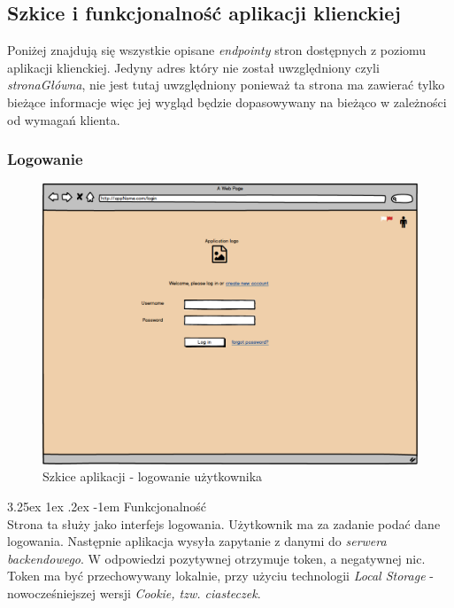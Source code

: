\documentclass[10pt,titlepage]{article} %
\makeatletter
\renewcommand{\normalsize}{\fontsize{8pt}{10pt}\selectfont} %
\renewcommand\paragraph{\@startsection{paragraph}{5}{\z@}%
  {3.25ex \@plus1ex \@minus.2ex}%
  {-1em}%
  {\normalfont\normalsize\bfseries}}
\makeatother
\begin{document}
\newpage
\subsection{Szkice i funkcjonalność aplikacji klienckiej}\label{Szkice i funkcjonalność aplikacji klienckiej}
Poniżej znajdują się wszystkie opisane \textit{endpointy} stron dostępnych z poziomu aplikacji klienckiej. Jedyny adres który nie został uwzględniony czyli \textit{stronaGłówna}, nie jest tutaj uwzględniony ponieważ ta strona ma zawierać tylko bieżące informacje więc jej wygląd będzie dopasowywany na bieżąco w zależności od wymagań klienta.

\subsubsection{Logowanie}
\begin{figure}[H]
\includegraphics[width=\textwidth]{img/sekcja2/loginScreenMock}
\caption[Szkice aplikacji - logowanie użytkownika]{Szkice aplikacji - logowanie użytkownika}
\end{figure}

\paragraph{Funkcjonalność}\mbox{}\\
Strona ta służy jako interfejs logowania. Użytkownik ma za zadanie podać dane logowania. Następnie aplikacja wysyła zapytanie z danymi do \textit{serwera backendowego}. W odpowiedzi pozytywnej otrzymuje token, a negatywnej nic. Token ma być przechowywany lokalnie, przy użyciu technologii \textit{Local Storage} - nowocześniejszej wersji \textit{Cookie, tzw. ciasteczek}.
\end{document}
